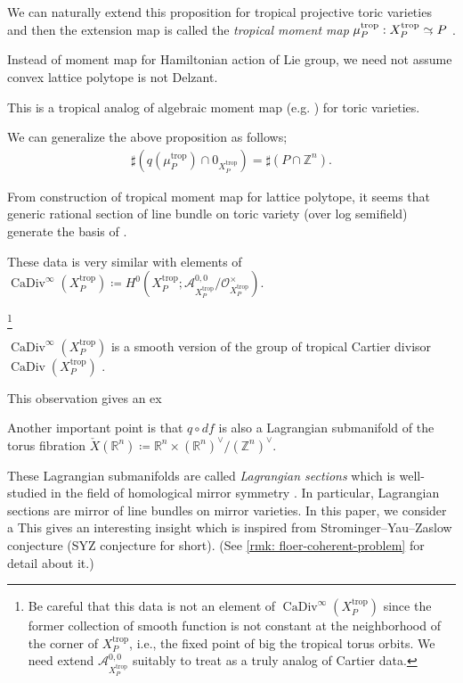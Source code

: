 \documentclass[a4paper,dvipdfmx,reqno,12pt]{amsart}
\theoremstyle{definition}
\newcommand{\deq}{\coloneqq}
\newcommand{\R}{\mathbb{R}}%
\newcommand{\Z}{\mathbb{Z}}%
\newcommand{\mcal}[1]{\mathcal{#1}}%
\newcommand{\opn}[1]{\operatorname{#1}}
\newcommand{\simto}{ 
\mathrel{\raisebox{0.13em}{${\sim}$}}
\kern -0.75em \mathrel{\raisebox{-0.11em}{${\scriptstyle \to}$}}  
}
\numberwithin{equation}{section}
\begin{document}
We can naturally extend this proposition for tropical projective toric 
varieties and then the extension map is called the \emph{tropical moment map}
$\mu_{P}^{\opn{trop}}: X_{P}^{\opn{trop}}\simto P$ 
\cite[Definition 2.1 (2)]{MR2428356}.

Instead of moment map for Hamiltonian action of Lie group, we
need not assume convex lattice polytope is not Delzant.

This is a tropical analog of algebraic moment map 
(e.g. \cite[]{coxToricVarieties2011a}) for toric varieties.

We can generalize the above proposition as follows;
\begin{align}
\sharp (q(\mu_P^{\opn{trop}}) \cap 0_{X_P^{\opn{trop}}})
=\sharp (P \cap \Z^{n}).
\end{align}

From construction of tropical moment map for lattice polytope,
it seems that generic rational section of line bundle on 
toric variety (over log semifield) generate the basis of
.


These data is very similar with elements of 
$\opn{CaDiv}^{\infty}(X_{P}^{\opn{trop}})\deq H^{0}(X_{P}^{\opn{trop}};
\mcal{A}^{0,0}_{X_{P}^{\opn{trop}}}/\mathcal{O}^{\times}_{X_{P}^{\opn{trop}}})$.

\footnote{Be careful that this data is not an element
of $\opn{CaDiv}^{\infty}(X_{P}^{\opn{trop}})$ since
 the former collection of smooth function is not constant
at the neighborhood of the corner of $X_{P}^{\opn{trop}}$,
i.e., the fixed point of big the tropical torus orbits.
We need extend $\mcal{A}^{0,0}_{X_{P}^{\opn{trop}}}$
suitably to treat as a truly analog of Cartier data.}



$\opn{CaDiv}^{\infty}(X_{P}^{\opn{trop}})$ is a
smooth version of the group of tropical Cartier divisor
$\opn{CaDiv}(X_{P}^{\opn{trop}})$ 
\cite[Definition 4.2]{jellLefschetzTheoremTropical2018a}.

This observation gives an ex

Another important point is that $q\circ df$ is also a Lagrangian
submanifold of the torus fibration $\check{X}(\R^{n})\deq \R^{n}\times (\R^{n})^{\vee}/(\Z^{n})^{\vee}$.


These Lagrangian submanifolds are called
\emph{Lagrangian sections} 
which is well-studied in the field of homological 
mirror symmetry 
\cite{kontsevichAffineStructuresNonArchimedean2006a,MR2452307}.
In particular, Lagrangian sections are mirror of line bundles on
mirror varieties. 
In this paper, we consider a 
This gives an interesting insight which is inspired from
Strominger--Yau--Zaslow conjecture 
(SYZ conjecture for short).
(See \cref{rmk: floer-coherent-problem} 
for detail about it.)
\end{document}
